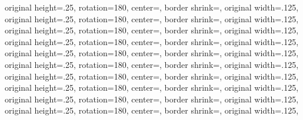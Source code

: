 {{	original height=.25\pgfpageoptionwidth,%
	rotation=180,%
	center=\pgfpoint{.25\pgfphysicalwidth}{.75\pgfphysicalheight},%
  }%
  {%
	border shrink=\pgfpageoptionborder,%
	original width=.125\pgfpageoptionheight,%
	original height=.25\pgfpageoptionwidth,%
	rotation=180,%
	center=\pgfpoint{1\pgfphysicalwidth}{.625\pgfphysicalheight},%
  }%
  {%
	border shrink=\pgfpageoptionborder,%
	original width=.125\pgfpageoptionheight,%
	original height=.25\pgfpageoptionwidth,%
	rotation=180,%
	center=\pgfpoint{0.75\pgfphysicalwidth}{.625\pgfphysicalheight},%
	}%
  {%
	border shrink=\pgfpageoptionborder,%
	original width=.125\pgfpageoptionheight,%
	original height=.25\pgfpageoptionwidth,%
	rotation=180,%
	center=\pgfpoint{.5\pgfphysicalwidth}{.625\pgfphysicalheight},%
  }%
  {%
	border shrink=\pgfpageoptionborder,%
	original width=.125\pgfpageoptionheight,%
	original height=.25\pgfpageoptionwidth,%
	rotation=180,%
	center=\pgfpoint{.25\pgfphysicalwidth}{.625\pgfphysicalheight},%
  }%
  {%
	border shrink=\pgfpageoptionborder,%
	original width=.125\pgfpageoptionheight,%
	original height=.25\pgfpageoptionwidth,%
	rotation=180,%
	center=\pgfpoint{1\pgfphysicalwidth}{.5\pgfphysicalheight},%
  }%
  {%
	border shrink=\pgfpageoptionborder,%
	original width=.125\pgfpageoptionheight,%
	original height=.25\pgfpageoptionwidth,%
	rotation=180,%
	center=\pgfpoint{0.75\pgfphysicalwidth}{.5\pgfphysicalheight},%
	}%
  {%
	border shrink=\pgfpageoptionborder,%
	original width=.125\pgfpageoptionheight,%
	original height=.25\pgfpageoptionwidth,%
	rotation=180,%
	center=\pgfpoint{.5\pgfphysicalwidth}{.5\pgfphysicalheight},%
  }%
  {%
	border shrink=\pgfpageoptionborder,%
	original width=.125\pgfpageoptionheight,%
	original height=.25\pgfpageoptionwidth,%
	rotation=180,%
	center=\pgfpoint{.25\pgfphysicalwidth}{.5\pgfphysicalheight},%
  }%
  {%
	border shrink=\pgfpageoptionborder,%
	original width=.125\pgfpageoptionheight,%
	original height=.25\pgfpageoptionwidth,%
	rotation=180,%
	center=\pgfpoint{1\pgfphysicalwidth}{.375\pgfphysicalheight},%
  }%
  {%
	border shrink=\pgfpageoptionborder,%
	original width=.125\pgfpageoptionheight,%
}}
